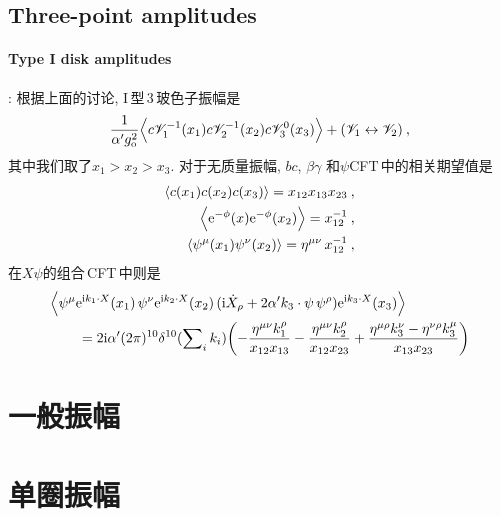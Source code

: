 \subsection*{Three-point amplitudes}

\paragraph*{Type I disk amplitudes}: 根据上面的讨论, I\,型\,3\,玻色子振幅是
\begin{equation}
    \frac{1}{\alpha^{\prime}g_{\mathrm{o}}^{2}}\Bigl\langle c\mathscr{V}_{1}^{-1}(x_{1})c\mathscr{V}^{-1}_{2}(x_{2})
    c\mathscr{V}_{3}^{0}(x_{3}) \Bigr\rangle + (\mathscr{V}_{1}\leftrightarrow\mathscr{V}_{2})\:, \label{12.4.1}
\end{equation}
其中我们取了$ x_{1}>x_{2}>x_{3}$. 对于无质量振幅, $bc$, $\beta\gamma$ 和$ \psi $CFT\,中的相关期望值是
\begin{subequations}
\begin{align}
    \langle c(x_{1})c(x_{2})c(x_{3})\rangle =x_{12}x_{13}x_{23} \:, \label{12.4.2a} \\
    \Bigl\langle \mathrm{e}^{-\phi}(x)\mathrm{e}^{-\phi}(x_{2})\Bigr\rangle = x_{12}^{-1} \:, \label{12.4.2b} \\
    \langle \psi^{\mu}(x_{1})\psi^{\nu}(x_{2})\rangle =\eta^{\mu\nu}\,x_{12}^{-1} \:, \label{12.4.2c}
\end{align} \label{12.4.2}
\end{subequations}
在$ X\psi $的组合\,CFT\,中则是
\begin{align}
    &\Bigl\langle \psi^{\mu}\mathrm{e}^{\mathrm{i} k_{1}\cdot X}(x_{1})\,\psi^{\nu}\mathrm{e}^{\mathrm{i} k_{2}\cdot X}(x_{2})\,
    (\mathrm{i} \dot{X}_{\rho}+2\alpha^{\prime}k_{3}\cdot\psi\,\psi^{\rho})\mathrm{e}^{\mathrm{i} k_{3}\cdot X}(x_{3})\Bigr\rangle \nonumber\\
    &\qquad=2\mathrm{i}\alpha^{\prime}(2\pi)^{10}\delta^{10}(\sum\nolimits_{i}k_{i})
    \biggl(-\frac{\eta^{\mu\nu}k_{1}^{\rho}}{x_{12}x_{13}}-\frac{\eta^{\mu\nu}k_{2}^{\rho}}{x_{12}x_{23}}
    +\frac{\eta^{\mu\rho}k_{3}^{\nu}-\eta^{\nu\rho}k_{3}^{\mu}}{x_{13}x_{23}}\biggr) \label{12.4.3}
\end{align}


\section{一般振幅}

\section{单圈振幅}